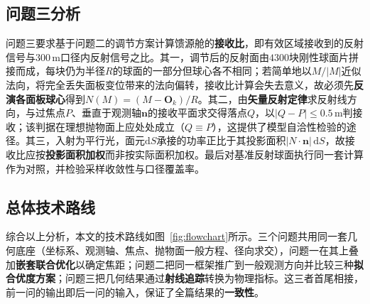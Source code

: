 \documentclass[withoutpreface]{cumcmthesis}
\begin{document}
\subsection{问题三分析}

问题三要求基于问题二的调节方案计算馈源舱的\textbf{接收比}，即有效区域接收到的反射信号与$300\,\mathrm{m}$口径内反射信号之比。其一，调节后的反射面由$4300$块刚性球面片拼接而成，每块仍为半径$R$的球面的一部分但球心各不相同；若简单地以$M/|M|$近似法向，将完全丢失面板变位带来的法向偏转，接收比计算会失去意义，故必须先\textbf{反演各面板球心}得到$N(M)=(M-\mathbf{O}_k)/R$。其二，由\textbf{矢量反射定律}求反射线方向，与过焦点$P$、垂直于观测轴$\mathbf{n}$的接收平面求交得落点$Q$，以$|Q-P|\le0.5\,\mathrm{m}$判接收；该判据在理想抛物面上应处处成立（$Q\equiv P$），这提供了模型自洽性检验的途径。其三，入射为平行光，面元$\mathrm{d}S$承接的功率正比于其投影面积$|N\cdot\mathbf{n}|\,\mathrm{d}S$，故接收比应按\textbf{投影面积加权}而非按实际面积加权。最后对基准反射球面执行同一套计算作为对照，并检验采样收敛性与口径覆盖率。

\subsection{总体技术路线}\label{sec:tech}

综合以上分析，本文的技术路线如图~\ref{fig:flowchart}所示。三个问题共用同一套几何底座（坐标系、观测轴、焦点、抛物面一般方程、径向求交），问题一在其上叠加\textbf{嵌套联合优化}以确定焦距；问题二把同一框架推广到一般观测方向并比较三种\textbf{拟合优度方案}；问题三把几何结果通过\textbf{射线追踪}转换为物理指标。这三者首尾相接，前一问的输出即后一问的输入，保证了全篇结果的\textbf{一致性}。
\end{document}

